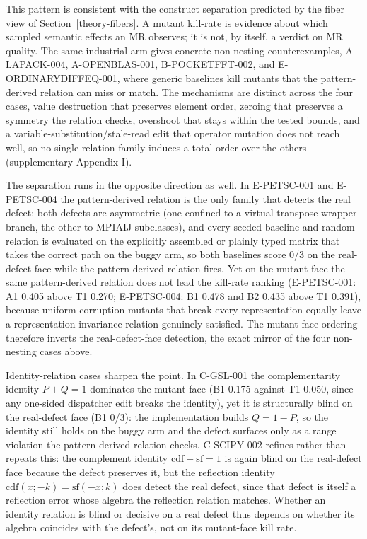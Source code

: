 \documentclass[manuscript,screen,review]{acmart}
\begin{document}
This pattern is consistent with the construct separation predicted by the
fiber view of Section~\ref{theory-fibers}. A mutant kill-rate is evidence about which sampled
semantic effects an MR observes; it is not, by itself, a verdict on MR
quality. The same industrial arm gives concrete non-nesting
counterexamples, A-LAPACK-004, A-OPENBLAS-001, B-POCKETFFT-002, and
E-ORDINARYDIFFEQ-001, where generic baselines kill mutants that the
pattern-derived relation can miss or match. The mechanisms are
distinct across the four cases, value destruction that preserves
element order, zeroing that preserves a symmetry the relation checks,
overshoot that stays within the tested bounds, and a
variable-substitution/stale-read edit that operator mutation does not
reach well, so no single relation family induces a total order over
the others (supplementary Appendix I).

The separation runs in the opposite direction as well. In E-PETSC-001 and
E-PETSC-004 the pattern-derived relation is the only family that detects
the real defect: both defects are asymmetric (one confined to a
virtual-transpose wrapper branch, the other to MPIAIJ subclasses), and
every seeded baseline and random relation is evaluated on the explicitly
assembled or plainly typed matrix that takes the correct path on the
buggy arm, so both baselines score 0/3 on the real-defect face while the
pattern-derived relation fires. Yet on the mutant face the same
pattern-derived relation does not lead the kill-rate ranking (E-PETSC-001:
A1 0.405 above T1 0.270; E-PETSC-004: B1 0.478 and B2 0.435 above T1
0.391), because uniform-corruption mutants that break every
representation equally leave a representation-invariance relation
genuinely satisfied. The mutant-face ordering therefore inverts the
real-defect-face detection, the exact mirror of the four non-nesting
cases above.

Identity-relation cases sharpen the point. In C-GSL-001 the
complementarity identity $P+Q=1$ dominates the mutant face (B1 0.175
against T1 0.050, since any one-sided dispatcher edit breaks the
identity), yet it is structurally blind on the real-defect face (B1 0/3):
the implementation builds $Q=1-P$, so the identity still holds on the
buggy arm and the defect surfaces only as a range violation the
pattern-derived relation checks. C-SCIPY-002 refines rather than repeats
this: the complement identity $\mathrm{cdf}+\mathrm{sf}=1$ is again blind
on the real-defect face because the defect preserves it, but the
reflection identity $\mathrm{cdf}(x;-k)=\mathrm{sf}(-x;k)$ does detect the
real defect, since that defect is itself a reflection error whose algebra
the reflection relation matches. Whether an identity relation is blind or
decisive on a real defect thus depends on whether its algebra coincides
with the defect's, not on its mutant-face kill rate.
\end{document}
